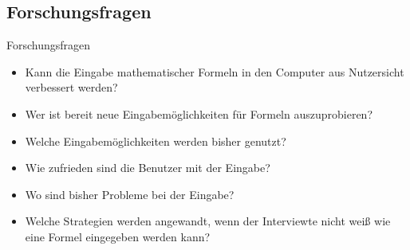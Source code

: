 
\subsection{Forschungsfragen}

\begin{frame}{Forschungsfragen}
\begin{itemize}[<+->]
    \item Kann die Eingabe mathematischer Formeln in den Computer aus Nutzersicht
          verbessert werden?
    \item Wer ist bereit neue Eingabemöglichkeiten für Formeln auszuprobieren?
    \item Welche Eingabemöglichkeiten werden bisher genutzt?
    \item Wie zufrieden sind die Benutzer mit der Eingabe?
    \item Wo sind bisher Probleme bei der Eingabe?
    \item Welche Strategien werden angewandt, wenn der Interviewte nicht weiß
          wie eine Formel eingegeben werden kann?
\end{itemize}
\end{frame}